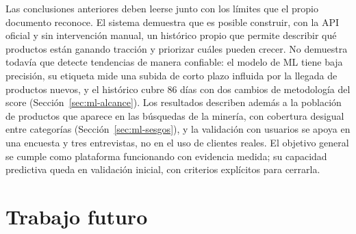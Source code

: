 Las conclusiones anteriores deben leerse junto con los límites que el propio documento reconoce. El sistema demuestra que es posible construir, con la API oficial y sin intervención manual, un histórico propio que permite describir qué productos están ganando tracción y priorizar cuáles pueden crecer. No demuestra todavía que detecte tendencias de manera confiable: el modelo de ML tiene baja precisión, su etiqueta mide una subida de corto plazo influida por la llegada de productos nuevos, y el histórico cubre 86 días con dos cambios de metodología del score (Sección~\ref{sec:ml-alcance}). Los resultados describen además a la población de productos que aparece en las búsquedas de la minería, con cobertura desigual entre categorías (Sección~\ref{sec:ml-sesgos}), y la validación con usuarios se apoya en una encuesta y tres entrevistas, no en el uso de clientes reales. El objetivo general se cumple como plataforma funcionando con evidencia medida; su capacidad predictiva queda en validación inicial, con criterios explícitos para cerrarla.

\section{Trabajo futuro}\label{sec:trabajo-futuro}


